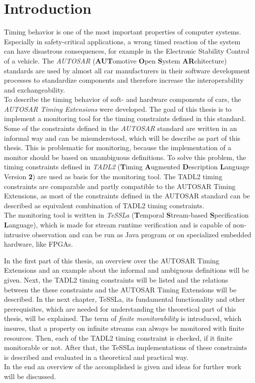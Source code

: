 
\chapter{Introduction}

	Timing behavior is one of the most important properties of computer systems. Especially in safety-critical applications, a wrong timed reaction of the system can have disastrous consequences, for example in the Electronic Stability Control of a vehicle. The \emph{AUTOSAR} (\textbf{AUT}omotive \textbf{O}pen \textbf{S}ystem \textbf{AR}chitecture) standards are used by almost all car manufacturers in their software development processes to standardize components and therefore increase the interoperability and exchangeability.\\
	To describe the timing behavior of soft- and hardware components of cars, the \emph{AUTOSAR Timing Extensions} were developed. The goal of this thesis is to implement a monitoring tool for the timing constraints defined in this standard.\\
	Some of the constraints defined in the \emph{AUTOSAR} standard are written in an informal way and can be misunderstood, which will be describe as part of this thesis. This is problematic for monitoring, because the implementation of a monitor should be based on unambiguous definitions. To solve this problem, the timing constraints defined in \emph{TADL2} (\textbf{T}iming \textbf{A}ugmented \textbf{D}escription \textbf{L}anguage Version \textbf{2}) are used as basis for the monitoring tool. The TADL2 timing constraints are comparable and partly compatible to the AUTOSAR Timing Extensions, as most of the constraints defined in the AUTOSAR standard can be described as equivalent combination of TADL2 timing constraints.\\
	The monitoring tool is written in \emph{TeSSLa} (\textbf{T}emporal \textbf{S}tream-based \textbf{S}pecification \textbf{L}anguage), which is made for stream runtime verification and is capable of non-intrusive observation and can be run as Java program or on specialized embedded hardware, like FPGAs.

	In the first part of this thesis, an overview over the AUTOSAR Timing Extensions and an example about the informal and ambiguous definitions  will be given. Next, the TADL2 timing constraints will be listed and the relations between the these constraints and the AUTOSAR Timing Extensions will be described.
	In the next chapter, TeSSLa, its fundamental functionality and other prerequisites, which are needed for understanding the theoretical part of this thesis, will be explained.
	The term of \emph{finite monitorability} is introduced, which insures, that a property on infinite streams can always be monitored with finite resources.
	Then, each of the TADL2 timing constraint is checked, if it finite monitorable or not. After that, the TeSSLa implementations of these constraints is described and evaluated in a theoretical and practical way.\\
	In the end an overview of the accomplished is given and ideas for further work will be discussed.